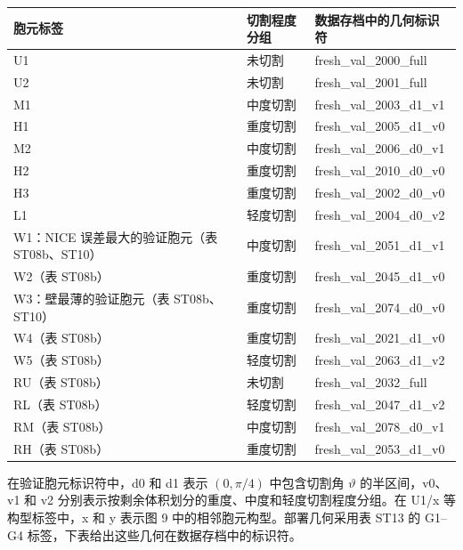 \documentclass[preprint,12pt,authoryear]{elsarticle}
\begin{document}
{\small
\begin{longtable}[]{@{}
  >{\raggedright\arraybackslash}p{}
  >{\raggedright\arraybackslash}p{}
  >{\raggedright\arraybackslash}p{}@{}}
\toprule\noalign{}
\begin{minipage}[b]{\linewidth}\raggedright
胞元标签
\end{minipage} & \begin{minipage}[b]{\linewidth}\raggedright
切割程度分组
\end{minipage} & \begin{minipage}[b]{\linewidth}\raggedright
数据存档中的几何标识符
\end{minipage} \\
\midrule\noalign{}
\endhead
\bottomrule\noalign{}
\endlastfoot
U1 & 未切割 & fresh\_val\_2000\_full \\
U2 & 未切割 & fresh\_val\_2001\_full \\
M1 & 中度切割 & fresh\_val\_2003\_d1\_v1 \\
H1 & 重度切割 & fresh\_val\_2005\_d1\_v0 \\
M2 & 中度切割 & fresh\_val\_2006\_d0\_v1 \\
H2 & 重度切割 & fresh\_val\_2010\_d0\_v0 \\
H3 & 重度切割 & fresh\_val\_2002\_d0\_v0 \\
L1 & 轻度切割 & fresh\_val\_2004\_d0\_v2 \\
W1：NICE 误差最大的验证胞元（表 ST08b、ST10） & 中度切割 & fresh\_val\_2051\_d1\_v1 \\
W2（表 ST08b） & 重度切割 & fresh\_val\_2045\_d1\_v0 \\
W3：壁最薄的验证胞元（表 ST08b、ST10） & 重度切割 & fresh\_val\_2074\_d0\_v0 \\
W4（表 ST08b） & 重度切割 & fresh\_val\_2021\_d1\_v0 \\
W5（表 ST08b） & 轻度切割 & fresh\_val\_2063\_d1\_v2 \\
RU（表 ST08b） & 未切割 & fresh\_val\_2032\_full \\
RL（表 ST08b） & 轻度切割 & fresh\_val\_2047\_d1\_v2 \\
RM（表 ST08b） & 中度切割 & fresh\_val\_2078\_d0\_v1 \\
RH（表 ST08b） & 重度切割 & fresh\_val\_2053\_d1\_v0 \\
\end{longtable}}

在验证胞元标识符中，d0 和 d1 表示 \((0,\pi/4)\) 中包含切割角 \(\vartheta\) 的半区间，v0、v1 和 v2 分别表示按剩余体积划分的重度、中度和轻度切割程度分组。在 U1/x 等构型标签中，x 和 y 表示图 9 中的相邻胞元构型。部署几何采用表 ST13 的 G1--G4 标签，下表给出这些几何在数据存档中的标识符。
\end{document}
